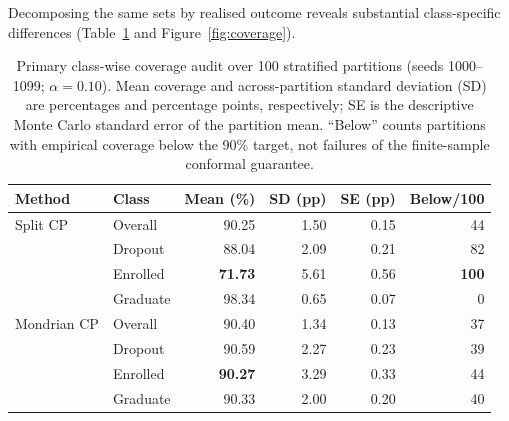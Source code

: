 Decomposing the same sets by realised outcome reveals substantial
class-specific differences (Table~\ref{tab:coverage} and Figure~\ref{fig:coverage}).

\begin{table}[htbp]
\centering\small
\caption{Primary class-wise coverage audit over 100 stratified partitions
(seeds 1000--1099; $\alpha=0.10$). Mean coverage and across-partition
standard deviation (SD) are percentages and percentage points, respectively;
SE is the descriptive Monte Carlo standard error of the partition mean.
``Below'' counts partitions with empirical coverage below the 90\% target,
not failures of the finite-sample conformal guarantee.}
\label{tab:coverage}
\begin{tabular}{llrrrr}
\toprule
Method & Class & Mean (\%) & SD (pp) & SE (pp) & Below/100 \\
\midrule
Split CP & Overall & 90.25 & 1.50 & 0.15 & 44 \\
 & \textsf{Dropout} & 88.04 & 2.09 & 0.21 & 82 \\
 & \textsf{Enrolled} & \textbf{71.73} & 5.61 & 0.56 & \textbf{100} \\
 & \textsf{Graduate} & 98.34 & 0.65 & 0.07 & 0 \\
\midrule
Mondrian CP & Overall & 90.40 & 1.34 & 0.13 & 37 \\
 & \textsf{Dropout} & 90.59 & 2.27 & 0.23 & 39 \\
 & \textsf{Enrolled} & \textbf{90.27} & 3.29 & 0.33 & 44 \\
 & \textsf{Graduate} & 90.33 & 2.00 & 0.20 & 40 \\
\bottomrule
\end{tabular}
\end{table}



